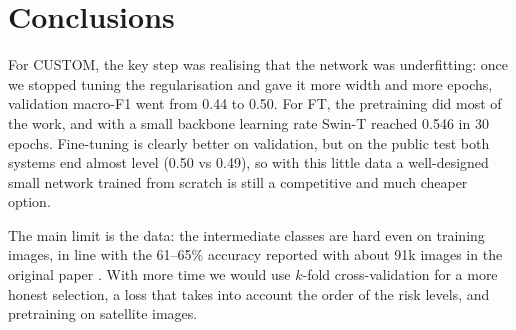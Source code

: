 \section{Conclusions}\label{sec:conclusions}

For CUSTOM, the key step was realising that the network was underfitting: once we stopped tuning the regularisation and gave it more width and more epochs, validation macro-F1 went from 0.44 to 0.50. For FT, the pretraining did most of the work, and with a small backbone learning rate Swin-T reached 0.546 in 30 epochs. Fine-tuning is clearly better on validation, but on the public test both systems end almost level (0.50 vs 0.49), so with this little data a well-designed small network trained from scratch is still a competitive and much cheaper option.

The main limit is the data: the intermediate classes are hard even on training images, in line with the 61--65\% accuracy reported with about 91k images in the original paper \citep{shen2023firerisk}. With more time we would use $k$-fold cross-validation for a more honest selection, a loss that takes into account the order of the risk levels, and pretraining on satellite images.
